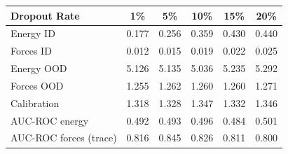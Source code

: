 \begin{tabular}{lccccc}
\toprule
{Dropout Rate}                & 1\% & 5\% & 10\% & 15\% & 20\%  \\
\midrule
Energy ID                 & 0.177 & 0.256 & 0.359 & 0.430 & 0.440  \\
Forces ID                 & 0.012 & 0.015 & 0.019 & 0.022 & 0.025  \\
Energy OOD                & 5.126 & 5.135 & 5.036 & 5.235 & 5.292  \\
Forces OOD               & 1.255 & 1.262 & 1.260 & 1.260 & 1.271  \\
\midrule
Calibration              &  1.318 & 1.328 & 1.347 & 1.332 & 1.346  \\
\midrule
AUC-ROC energy           &  0.492 & 0.493 & 0.496 & 0.484 & 0.501 \\
AUC-ROC forces (trace)   &  0.816 & 0.845 & 0.826 & 0.811 & 0.800 \\
\bottomrule
\end{tabular}